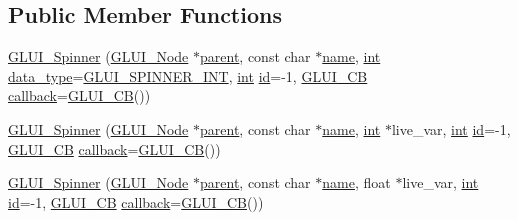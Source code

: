 \subsection*{Public Member Functions}
\begin{DoxyCompactItemize}
\item 
\hyperlink{class_g_l_u_i___spinner_a7a0a9950bfea2df037b2f13b21585d7b}{G\+L\+U\+I\+\_\+\+Spinner} (\hyperlink{class_g_l_u_i___node}{G\+L\+U\+I\+\_\+\+Node} $\ast$\hyperlink{class_g_l_u_i___node_a8ed65d447784f6f88bd3e2e2bcac6cdb}{parent}, const char $\ast$\hyperlink{glext_8h_ad977737dfc9a274a62741b9500c49a32}{name}, \hyperlink{wglext_8h_a500a82aecba06f4550f6849b8099ca21}{int} \hyperlink{class_g_l_u_i___spinner_a821f0e5b5f040f93f53ee7441abfc44e}{data\+\_\+type}=\hyperlink{glui_8h_ae338c1175e5bb430d7a14d109daee74a}{G\+L\+U\+I\+\_\+\+S\+P\+I\+N\+N\+E\+R\+\_\+\+I\+N\+T}, \hyperlink{wglext_8h_a500a82aecba06f4550f6849b8099ca21}{int} \hyperlink{glext_8h_a58c2a664503e14ffb8f21012aabff3e9}{id}=-\/1, \hyperlink{class_g_l_u_i___c_b}{G\+L\+U\+I\+\_\+\+C\+B} \hyperlink{class_g_l_u_i___control_a96060fe0cc6d537e736dd6eef78e24ab}{callback}=\hyperlink{class_g_l_u_i___c_b}{G\+L\+U\+I\+\_\+\+C\+B}())
\item 
\hyperlink{class_g_l_u_i___spinner_afdb231b113e73b8714a36effcc9edf94}{G\+L\+U\+I\+\_\+\+Spinner} (\hyperlink{class_g_l_u_i___node}{G\+L\+U\+I\+\_\+\+Node} $\ast$\hyperlink{class_g_l_u_i___node_a8ed65d447784f6f88bd3e2e2bcac6cdb}{parent}, const char $\ast$\hyperlink{glext_8h_ad977737dfc9a274a62741b9500c49a32}{name}, \hyperlink{wglext_8h_a500a82aecba06f4550f6849b8099ca21}{int} $\ast$live\+\_\+var, \hyperlink{wglext_8h_a500a82aecba06f4550f6849b8099ca21}{int} \hyperlink{glext_8h_a58c2a664503e14ffb8f21012aabff3e9}{id}=-\/1, \hyperlink{class_g_l_u_i___c_b}{G\+L\+U\+I\+\_\+\+C\+B} \hyperlink{class_g_l_u_i___control_a96060fe0cc6d537e736dd6eef78e24ab}{callback}=\hyperlink{class_g_l_u_i___c_b}{G\+L\+U\+I\+\_\+\+C\+B}())
\item 
\hyperlink{class_g_l_u_i___spinner_ae1ea318b4c526ba0090a3989c3e87dfb}{G\+L\+U\+I\+\_\+\+Spinner} (\hyperlink{class_g_l_u_i___node}{G\+L\+U\+I\+\_\+\+Node} $\ast$\hyperlink{class_g_l_u_i___node_a8ed65d447784f6f88bd3e2e2bcac6cdb}{parent}, const char $\ast$\hyperlink{glext_8h_ad977737dfc9a274a62741b9500c49a32}{name}, float $\ast$live\+\_\+var, \hyperlink{wglext_8h_a500a82aecba06f4550f6849b8099ca21}{int} \hyperlink{glext_8h_a58c2a664503e14ffb8f21012aabff3e9}{id}=-\/1, \hyperlink{class_g_l_u_i___c_b}{G\+L\+U\+I\+\_\+\+C\+B} \hyperlink{class_g_l_u_i___control_a96060fe0cc6d537e736dd6eef78e24ab}{callback}=\hyperlink{class_g_l_u_i___c_b}{G\+L\+U\+I\+\_\+\+C\+B}())

\end{DoxyCompactItemize}
